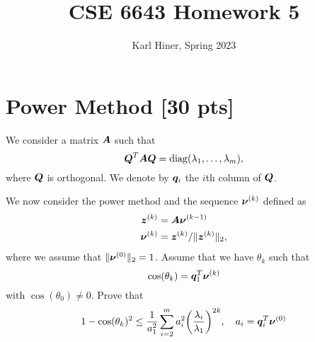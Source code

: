 \documentclass[twoside,10pt]{article}
\begin{document}
\title{CSE 6643 Homework 5}
\author{Karl Hiner, Spring 2023}
\date{}
\maketitle

\section{Power Method [30 pts]} 

We consider a matrix $\bm{A}$ such that
\begin{equation} 
  \mtx{Q}^T \mtx{A} \mtx{Q} = \operatorname{diag}\left(\lambda_1, \ldots, \lambda_m\right),
\end{equation}
where $\bm{Q}$ is orthogonal. We denote by $\bm{q}_i$ the $i$th column of $\bm{Q}$. 

We now consider the power method and the sequence $\bm{\nu}^{(k)}$  defined as 
\begin{align}
  \bm{z}^{(k)} &= \bm{A} \bm{\nu}^{(k - 1)} \\
  \bm{\nu}^{(k)} &= \bm{z}^{(k)} / \|\bm{z}^{(k)}\|_2,
\end{align}
where we assume that $\|\bm{\nu}^{(0)}\|_2 = 1$. Assume that we have $\theta_k$ such that 
\begin{equation}
  \cos(\theta_k) = \bm{q}_1^{T} \bm{\nu}^{(k)}
\end{equation}
with $\cos(\theta_{0}) \neq 0$.
Prove that 
\begin{equation}
  1 - \cos(\theta_k)^2 \leq \frac{1}{a_1^2} \sum \limits_{i = 2}^m a_i^2\left(\frac{\lambda_{i}}{\lambda_1}\right)^{2k}, \quad a_i = \vct{q}_i^T \vct{\nu}^{(0)} 
\end{equation}
\end{document}
